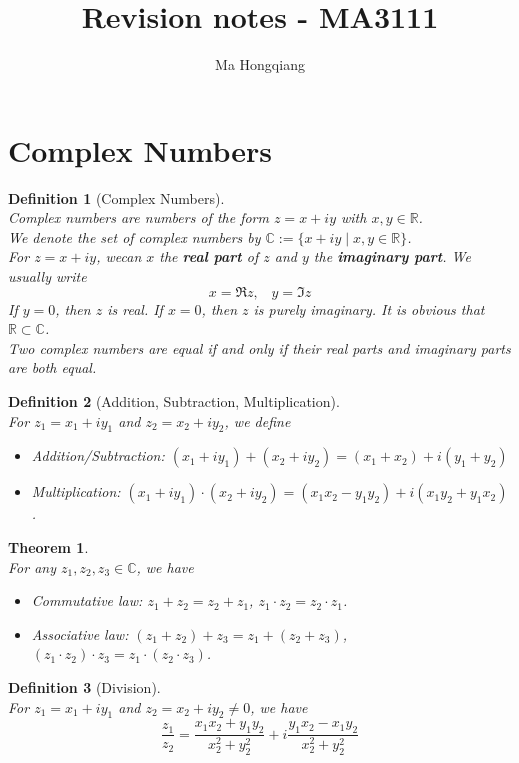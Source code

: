 \documentclass[12pt]{article}
\newtheorem{definition}{Definition}[section]
\newtheorem{theorem}{Theorem}[section]
\theoremstyle{definition}
\begin{document}
\title{Revision notes - MA3111}
\author{Ma Hongqiang}
\maketitle
\tableofcontents

\clearpage
\section{Complex Numbers}
\begin{definition}[Complex Numbers]
\hfill\\\normalfont Complex numbers are numbers of the form $z=x+iy$ with $x,y\in\mathbb{R}$.\\
We denote the set of complex numbers by $\mathbb{C}:=\{x+iy\mid x,y\in\mathbb{R}\}$.\\
For $z=x+iy$, wecan $x$ the \textbf{real part} of $z$ and $y$ the \textbf{imaginary part}. We usually write
\[
x=\Re z, \;\;\;y=\Im z
\]
If $y=0$, then $z$ is real. If $x=0$, then $z$ is purely imaginary. It is obvious that $\mathbb{R}\subset\mathbb{C}$.\\
Two complex numbers are equal if and only if their real parts and imaginary parts are both equal.
\end{definition}
\begin{definition}[Addition, Subtraction, Multiplication]
\hfill\\\normalfont
For $z_1=x_1+iy_1$ and $z_2=x_2+iy_2$, we define 
\begin{itemize}
	\item Addition/Subtraction: $(x_1+iy_1) + (x_2+iy_2)= (x_1 + x_2) + i(y_1 + y_2)$
	\item Multiplication: $(x_1+iy_1)\cdot (x_2+iy_2) = (x_1x_2-y_1y_2)+i(x_1y_2+y_1x_2)$.
\end{itemize}
\end{definition}
\begin{theorem}
\hfill\\\normalfont For any $z_1,z_2,z_3\in\mathbb{C}$, we have
\begin{itemize}
	\item Commutative law: $z_1 + z_2 = z_2 + z_1$, $z_1\cdot z_2 = z_2\cdot z_1$.
	\item Associative law: $(z_1+z_2)+z_3 = z_1+(z_2+z_3)$, $(z_1\cdot z_2)\cdot z_3 = z_1\cdot(z_2\cdot z_3)$.
\end{itemize}
\end{theorem}
\begin{definition}[Division]
\hfill\\\normalfont For $z_1=x_1+iy_1$ and $z_2=x_2+iy_2\neq 0$, we have
\[
\frac{z_1}{z_2} = \frac{x_1x_2+y_1y_2}{x_2^2+y_2^2} + i\frac{y_1x_2-x_1y_2}{x_2^2+y_2^2}
\]
\end{definition}
\end{document}
